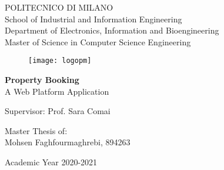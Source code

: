 \thispagestyle{empty}
\vspace*{-1.7cm} \bfseries{

\begin{center}
    \normalsize
    POLITECNICO DI MILANO\\
    \small
    School of Industrial and Information Engineering\\
    Department of Electronics, Information and Bioengineering\\
    Master of Science in Computer Science Engineering\\
    \vspace*{0.3cm}
    \begin{figure}[H]
    \begin{center}
        \texttt{[image: logopm]}
    \end{center}
    \end{figure}
    
    \vspace*{0.3cm} \large

    \textbf{Property Booking }\\
    
    \vspace*{.75truecm} \normalsize
    A Web Platform Application
\end{center}

\vspace*{2.0cm} \normalsize

\begin{flushleft}
\begin{addmargin}[1em]{1em}
  Supervisor: Prof. Sara Comai\\
  
\end{addmargin}
\end{flushleft}

\vspace*{1.0cm}

\begin{addmargin}[1em]{1em}
\begin{flushright}

 Master Thesis of:\\ Mohsen Faghfourmaghrebi, 894263  \\ 

\end{flushright}
\end{addmargin}

\vspace*{1.5cm}

\begin{center}
Academic Year 2020-2021
\end{center} \clearpage
}
\normalfont